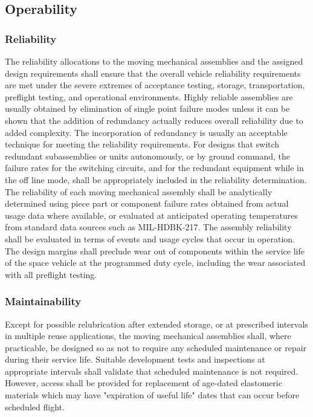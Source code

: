 \documentclass[12pt]{article}
\begin{document}
\subsection{Operability} %
\subsubsection{Reliability} %
The reliability allocations to the moving mechanical assemblies and the assigned design requirements shall ensure that the overall vehicle reliability requirements are met under the severe extremes of acceptance testing, storage, transportation, preflight testing, and operational environments. 
Highly reliable assemblies are usually obtained by elimination of single point failure modes unless it can be shown that the addition of redundancy actually reduces overall reliability due to added complexity. 
The incorporation of redundancy is usually an acceptable technique for meeting the reliability requirements. 
For designs that switch redundant subassemblies or units autonomously, or by ground command, the failure rates for the switching circuits, and for the redundant equipment while in the off line mode, shall be appropriately included in the reliability determination. 
The reliability of each moving mechanical assembly shall be analytically determined using piece part or component failure rates obtained from actual usage data where available, or evaluated at anticipated operating temperatures from standard data sources such as MIL-HDBK-217. 
The assembly reliability shall be evaluated in terms of events and usage cycles that occur in operation. 
The design margins shall preclude wear out of components within the service life of the space vehicle at the programmed duty cycle, including the wear associated with all preflight testing.

\subsubsection{Maintainability} %
Except for possible relubrication after extended storage, or at prescribed intervals in multiple reuse applications, the moving mechanical assemblies shall, where practicable, be designed so as not to require any scheduled maintenance or repair during their service life.
Suitable development tests and inspections at appropriate intervals shall validate that scheduled maintenance is not required. 
However, access shall be provided for replacement of age-dated elastomeric materials which may have "expiration of useful life" dates that can occur before scheduled flight.
\end{document}
